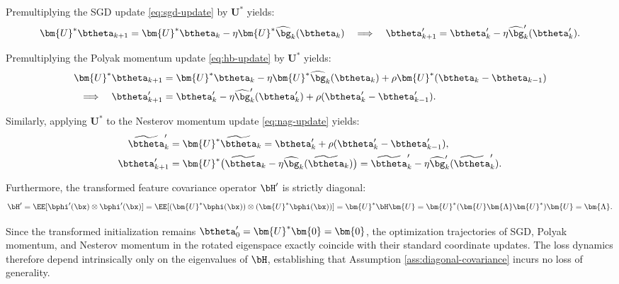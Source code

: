 Premultiplying the SGD update \eqref{eq:sgd-update} by $\bm{U}^*$ yields:
\begin{equation*}
    \bm{U}^* \btheta_{k+1} = \bm{U}^* \btheta_k - \eta \bm{U}^* \widehat{\bg}_k(\btheta_k) \quad \Longrightarrow \quad \btheta'_{k+1} = \btheta'_k - \eta \widehat{\bg}'_k(\btheta'_k).
\end{equation*}

Premultiplying the Polyak momentum update \eqref{eq:hb-update} by $\bm{U}^*$ yields:
\begin{equation*}
\begin{aligned}
    \bm{U}^* \btheta_{k+1} &= \bm{U}^* \btheta_k - \eta \bm{U}^* \widehat{\bg}_k(\btheta_k) + \rho \bm{U}^*(\btheta_k - \btheta_{k-1}) \\
    \Longrightarrow \quad \btheta'_{k+1} &= \btheta'_k - \eta \widehat{\bg}'_k(\btheta'_k) + \rho(\btheta'_k - \btheta'_{k-1}).
\end{aligned}
\end{equation*}

Similarly, applying $\bm{U}^*$ to the Nesterov momentum update \eqref{eq:nag-update} yields:
\begin{equation*}
\begin{aligned}
    \widetilde{\btheta}'_k &= \bm{U}^* \widetilde{\btheta}_k = \btheta'_k + \rho(\btheta'_k - \btheta'_{k-1}), \\
    \btheta'_{k+1} &= \bm{U}^* \big(\widetilde{\btheta}_k - \eta \widehat{\bg}_k(\widetilde{\btheta}_k)\big) = \widetilde{\btheta}'_k - \eta \widehat{\bg}'_k(\widetilde{\btheta}'_k).
\end{aligned}
\end{equation*}

Furthermore, the transformed feature covariance operator $\bH'$ is strictly diagonal:
\begin{equation*}
    \bH' = \EE[\bphi'(\bx) \otimes \bphi'(\bx)] 
    = \EE[(\bm{U}^* \bphi(\bx)) \otimes (\bm{U}^* \bphi(\bx))] 
    = \bm{U}^* \bH \bm{U} 
    = \bm{U}^* (\bm{U} \bm{\Lambda} \bm{U}^*) \bm{U} 
    = \bm{\Lambda}.
\end{equation*}

Since the transformed initialization remains $\btheta'_0 = \bm{U}^* \bm{0} = \bm{0}$, the optimization trajectories of SGD, Polyak momentum, and Nesterov momentum in the rotated eigenspace exactly coincide with their standard coordinate updates. The loss dynamics therefore depend intrinsically only on the eigenvalues of $\bH$, establishing that Assumption \ref{ass:diagonal-covariance} incurs no loss of generality.



